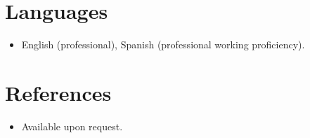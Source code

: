 \documentclass[11pt,a4paper,sans]{moderncv}
\begin{document}
\section{Languages}
\vspace{1pt}
\begin{itemize}
\item English (professional), Spanish (professional working proficiency).
\end{itemize}


\section{References}
\vspace{1pt}
\begin{itemize}
\item{Available upon request.}
\end{itemize}
\end{document}
